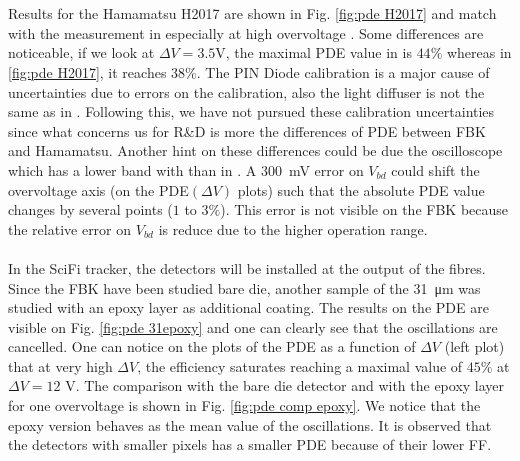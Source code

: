 \\
\\
Results for the Hamamatsu H2017 are shown in Fig. \ref{fig:pde H2017} and match with the measurement in  especially at high overvoltage \cite{Girard2018CharacterisationDistributions}. Some differences are noticeable, if we look at $\Delta V = 3.5$V, the maximal PDE value in \cite{Girard2018CharacterisationDistributions} is $44 \%$ whereas in \ref{fig:pde H2017}, it reaches $38\%$.
The PIN Diode calibration is a major cause of uncertainties due to errors on the calibration, also the light diffuser is not the same as in \cite{Girard2018CharacterisationDistributions}. Following this, we have not pursued these calibration uncertainties since what concerns us  for R\&D is more the differences of PDE between FBK and Hamamatsu. 
Another hint on these differences could be due the oscilloscope which has a lower band with than in \cite{Girard2018CharacterisationDistributions}. A \SI{300}{\milli V} error on $V_{bd}$ could shift the overvoltage axis (on the PDE$(\Delta V)$ plots) such that the absolute PDE value changes by several points ($1$ to $3\%$). This error is not visible on the FBK because the relative error on $V_{bd}$ is reduce due to the higher operation range.\\
\\
In the SciFi tracker, the detectors will be installed at the output of the fibres. Since the FBK have been studied bare die, another sample of the \SI{31}{\micro m} was studied with an epoxy layer as additional coating. The results on the PDE are visible on Fig. \ref{fig:pde 31epoxy} and one can clearly see that the oscillations are cancelled. %
One can notice on the plots of the PDE as a function of $\Delta V$ (left plot) that at very high $\Delta V$, the efficiency saturates reaching a maximal value of $45\%$ at $\Delta V=12 $ V. The comparison with the bare die detector and with the epoxy layer for one overvoltage is shown in Fig. \ref{fig:pde comp epoxy}. We notice that the epoxy version behaves as the mean value of the oscillations. 
It is observed that the detectors with smaller pixels has a smaller PDE because of their lower FF. 

